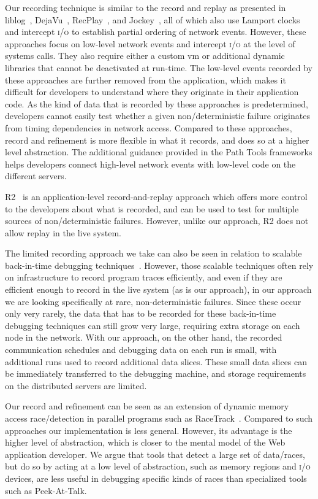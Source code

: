 \documentclass[preprint,3p]{elsarticle}
\newcommand{\ac}[1]{\gls{#1}}
\newcommand{\io}{\textsc{i/o}\xspace}
\newcommand{\toolname}{Peek-At-Talk\xspace}
\begin{document}
Our recording technique is similar to the record and replay as presented in
liblog~\cite{Geels2006Replay}, DejaVu~\cite{Konuru2000},
RecPlay~\cite{Gent1999}, and Jockey~\cite{Saito2005}, all of which also use
Lamport clocks and intercept \io to establish partial ordering of network
events. However, these approaches focus on low-level network events and
intercept \io at the level of systems calls. They also require either a custom
\ac{vm} or additional dynamic libraries that cannot be deactivated at
run-time. The low-level events recorded by these approaches are further removed
from the application, which makes it difficult for developers to understand
where they originate in their application code. As the kind of data that is
recorded by these approaches is predetermined, developers cannot easily test
whether a given non\-/deterministic failure originates from timing dependencies
in network access. Compared to these approaches, record and refinement is more
flexible in what it records, and does so at a higher level abstraction. The
additional guidance provided in the Path Tools frameworks helps developers
connect high-level network events with low-level code on the different servers.

R2~\cite{guo2008r2} is an application-level record-and-replay approach
which offers more control to the developers about what is recorded,
and can be used to test for multiple sources of non\-/deterministic
failures. However, unlike our approach, R2 does not allow replay in
the live system.

The limited recording approach we take can also be seen in relation to scalable
back-in-time debugging
techniques~\cite{Pothier:2007:SOD:1297105.1297067,Lienhard:2008:POB:1428508.1428542}. However,
those scalable techniques often rely on infrastructure to record program traces
efficiently, and even if they are efficient enough to record in the live system
(as is our approach), in our approach we are looking specifically at rare,
non-deterministic failures. Since these occur only very rarely, the data that
has to be recorded for these back-in-time debugging techniques can still grow
very large, requiring extra storage on each node in the network. With our
approach, on the other hand, the recorded communication schedules and debugging
data on each run is small, with additional runs used to record additional data
slices. These small data slices can be immediately transferred to the debugging
machine, and storage requirements on the distributed servers are limited.

Our record and refinement can be seen as an extension of dynamic
memory access race\-/detection in parallel programs such as
RaceTrack~\cite{yu2005racetrack}. Compared to such approaches our
implementation is less general. However, its advantage is the higher
level of abstraction, which is closer to the mental model of the Web
application developer. We argue that tools that detect a large set of
data\-/races, but do so by acting at a low level of abstraction, such
as memory regions and \io devices, are less useful in debugging
specific kinds of races than specialized tools such as \toolname.
\end{document}
